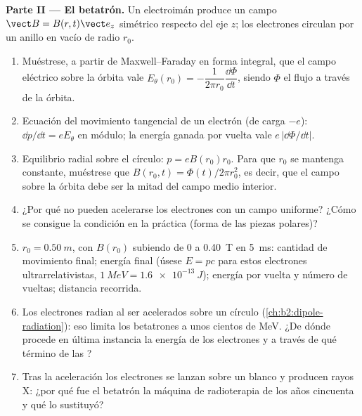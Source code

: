 \begin{problem}
\medskip
\noindent\textbf{Parte II --- El betatrón.}
Un electroimán produce un campo $\vect B = B(r, t)\vect e_z$ simétrico respecto
del eje $z$; los electrones circulan por un anillo en vacío de radio $r_0$.
\begin{enumerate}[resume]
  \item Muéstrese, a partir de Maxwell--Faraday en forma integral, que el
        campo eléctrico sobre la órbita vale $E_\theta(r_0) = -\dfrac1{2\pi r_0}
        \dfrac{\dd\Phi}{\dd t}$, siendo $\Phi$ el flujo a través de la órbita.
  \item Ecuación del movimiento tangencial de un electrón (de carga $-e$):
        $\dd p/\dd t = eE_\theta$ en módulo; la energía ganada por vuelta vale
        $e\,|\dd\Phi/\dd t|$.
  \item Equilibrio radial sobre el círculo: $p = eB(r_0)r_0$. Para que $r_0$
        se mantenga constante, muéstrese que $B(r_0, t) = \Phi(t)/2\pi r_0^2$, es decir, que el
        campo sobre la órbita debe ser la mitad del campo medio interior.
  \item ¿Por qué no pueden acelerarse los electrones con un campo
        uniforme? ¿Cómo se consigue la condición en la práctica (forma de
        las piezas polares)?
  \item $r_0 = \qty{0.50}{m}$, con $B(r_0)$ subiendo de $0$ a \qty{0.40}{T} en
        \qty{5}{ms}: cantidad de movimiento final; energía final (úsese
        $E = pc$ para estos electrones ultrarrelativistas,
        $\qty{1}{MeV} = \qty{1.6e-13}{J}$); energía por vuelta y número de
        vueltas; distancia recorrida.
  \item Los electrones radian al ser acelerados sobre un círculo
        (\cref{ch:b2:dipole-radiation}): eso limita los betatrones a unos
        cientos de MeV. ¿De dónde procede en última instancia la energía de
        los electrones y a través de qué término de las ?
  \item Tras la aceleración los electrones se lanzan sobre un blanco y
        producen rayos X: ¿por qué fue el betatrón la máquina de
        radioterapia de los años cincuenta y qué lo sustituyó?
\end{enumerate}


\end{problem}
